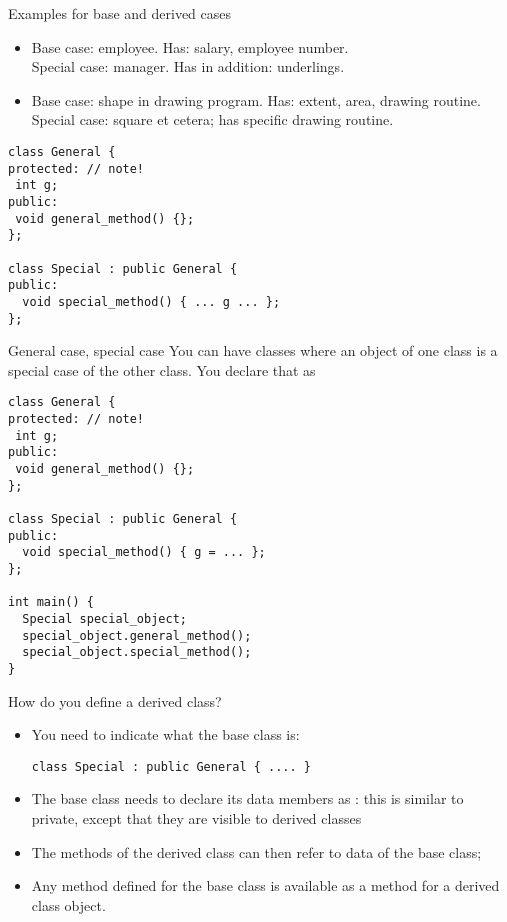 \begin{block}{Examples for base and derived cases}
  \label{sl:derived-example}
  \begin{itemize}
  \item Base case: employee. Has: salary, employee number.\\
    Special case: manager. Has in addition: underlings.
  \item Base case: shape in drawing program. Has: extent, area,
    drawing routine.\\
    Special case: square et cetera; has specific drawing routine.
  \end{itemize}  
\end{block}

\begin{lstlisting}
class General {
protected: // note!
 int g;
public:
 void general_method() {};
};

class Special : public General {
public:
  void special_method() { ... g ... };
};
\end{lstlisting}

\begin{slide}{General case, special case}
  \label{sl:obj-case}
  You can have classes where an object of one class is a special case of
  the other class. You declare that as
\begin{lstlisting}
class General {
protected: // note!
 int g;
public:
 void general_method() {};
};

class Special : public General {
public:
  void special_method() { g = ... };
};

int main() {
  Special special_object;
  special_object.general_method();
  special_object.special_method();
}
\end{lstlisting}
\end{slide}

How do you define a derived class?
\begin{itemize}
\item You need to indicate what the base class is:
\begin{lstlisting}
class Special : public General { .... }
\end{lstlisting}
\item The base class needs to declare its data members as
  : this is similar to private, except that
  they are visible to derived classes
\item The methods of the derived class can then refer to data of the
  base class;
\item Any method defined for the base class is available as a method
  for a derived class object.
\end{itemize}

